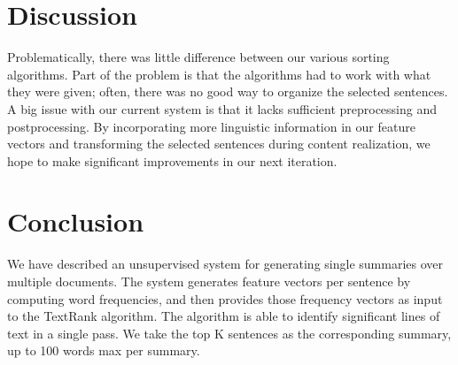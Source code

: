 \documentclass[11pt]{article}
\begin{document}
\section{Discussion}
Problematically, there was little difference between our various sorting algorithms. Part of the problem is that the algorithms had to work with what they were given; often, there was no good way to organize the selected sentences.\\
A big issue with our current system is that it lacks sufficient preprocessing and postprocessing. By incorporating more linguistic information in our feature vectors and transforming the selected sentences during content realization, we hope to make significant improvements in our next iteration.\\


\section{Conclusion}
 We have described an unsupervised system for generating single summaries over multiple documents. The system generates feature vectors per sentence by computing word frequencies, and then provides those frequency vectors as input to the TextRank algorithm. The algorithm is able to identify significant lines of text in a single pass. We take the top K sentences as the corresponding summary, up to 100 words max per summary.

%
%

\end{document}
